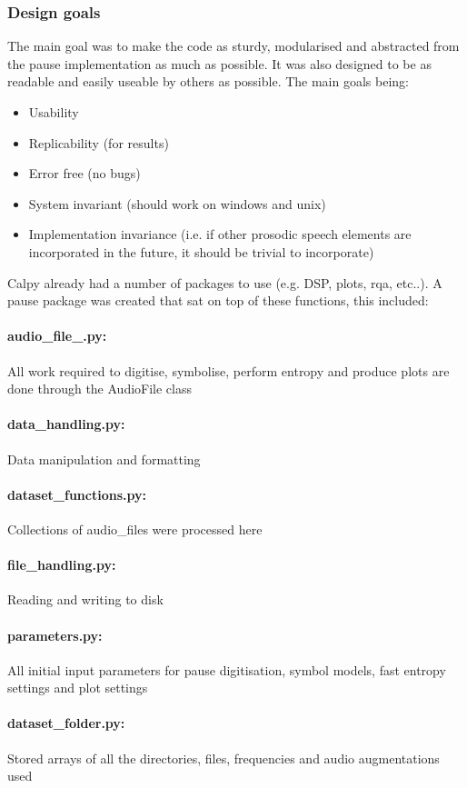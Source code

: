 \subsubsection{Design goals}
The main goal was to make the code as sturdy, modularised and abstracted from the pause implementation as much as possible. It was also designed to be as readable and easily useable by others as possible. The main goals being:
\begin{itemize}
	\item Usability
	\item Replicability (for results)
	\item Error free (no bugs)
	\item System invariant (should work on windows and unix)
	\item Implementation invariance (i.e. if other prosodic speech elements are incorporated in the future, it should be trivial to incorporate)
\end{itemize}

Calpy already had a number of packages to use (e.g. DSP, plots, rqa, etc..). A pause package was created that sat on top of these functions, this included:
\paragraph{audio\_file\_.py:} All work required to digitise, symbolise, perform entropy and produce plots are done through the AudioFile class
\paragraph{data\_handling.py:} Data manipulation and formatting
\paragraph{dataset\_functions.py:} Collections of audio\_files were processed here
\paragraph{file\_handling.py:} Reading and writing to disk
\paragraph{parameters.py:} All initial input parameters for pause digitisation, symbol models, fast entropy settings and plot settings 
\paragraph{dataset\_folder.py:} Stored arrays of all the directories, files, frequencies and audio augmentations used \\


